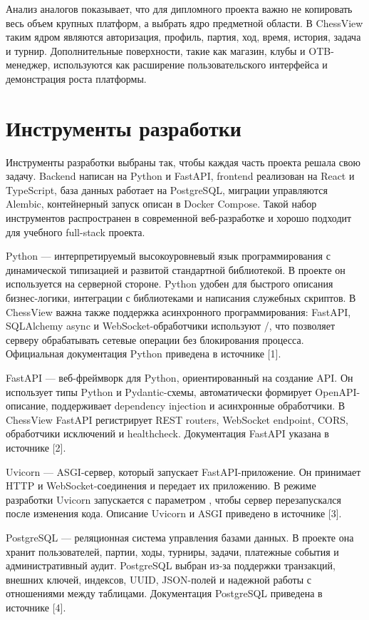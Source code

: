 Анализ аналогов показывает, что для дипломного проекта важно не копировать весь объем крупных платформ, а выбрать ядро предметной области. В ChessView таким ядром являются авторизация, профиль, партия, ход, время, история, задача и турнир. Дополнительные поверхности, такие как магазин, клубы и OTB-менеджер, используются как расширение пользовательского интерфейса и демонстрация роста платформы.

\section{Инструменты разработки}

Инструменты разработки выбраны так, чтобы каждая часть проекта решала свою задачу. Backend написан на Python и FastAPI, frontend реализован на React и TypeScript, база данных работает на PostgreSQL, миграции управляются Alembic, контейнерный запуск описан в Docker Compose. Такой набор инструментов распространен в современной веб-разработке и хорошо подходит для учебного full-stack проекта.

Python --- интерпретируемый высокоуровневый язык программирования с динамической типизацией и развитой стандартной библиотекой. В проекте он используется на серверной стороне. Python удобен для быстрого описания бизнес-логики, интеграции с библиотеками и написания служебных скриптов. В ChessView важна также поддержка асинхронного программирования: FastAPI, SQLAlchemy async и WebSocket-обработчики используют /, что позволяет серверу обрабатывать сетевые операции без блокирования процесса. Официальная документация Python приведена в источнике [1].

FastAPI --- веб-фреймворк для Python, ориентированный на создание API. Он использует типы Python и Pydantic-схемы, автоматически формирует OpenAPI-описание, поддерживает dependency injection и асинхронные обработчики. В ChessView FastAPI регистрирует REST routers, WebSocket endpoint, CORS, обработчики исключений и healthcheck. Документация FastAPI указана в источнике [2].

Uvicorn --- ASGI-сервер, который запускает FastAPI-приложение. Он принимает HTTP и WebSocket-соединения и передает их приложению. В режиме разработки Uvicorn запускается с параметром , чтобы сервер перезапускался после изменения кода. Описание Uvicorn и ASGI приведено в источнике [3].

PostgreSQL --- реляционная система управления базами данных. В проекте она хранит пользователей, партии, ходы, турниры, задачи, платежные события и административный аудит. PostgreSQL выбран из-за поддержки транзакций, внешних ключей, индексов, UUID, JSON-полей и надежной работы с отношениями между таблицами. Документация PostgreSQL приведена в источнике [4].


